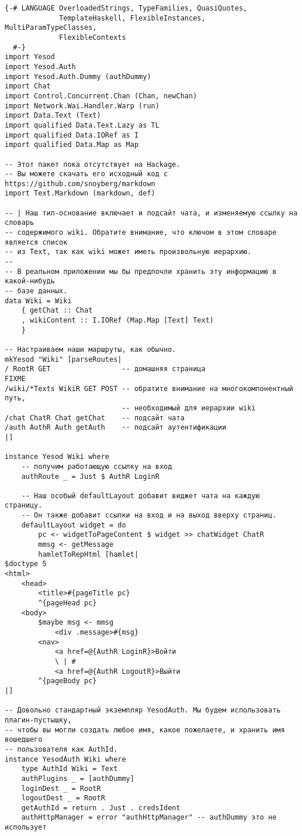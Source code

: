 \begin{lstlisting}
{-# LANGUAGE OverloadedStrings, TypeFamilies, QuasiQuotes,
             TemplateHaskell, FlexibleInstances, MultiParamTypeClasses,
             FlexibleContexts
  #-}
import Yesod
import Yesod.Auth
import Yesod.Auth.Dummy (authDummy)
import Chat
import Control.Concurrent.Chan (Chan, newChan)
import Network.Wai.Handler.Warp (run)
import Data.Text (Text)
import qualified Data.Text.Lazy as TL
import qualified Data.IORef as I
import qualified Data.Map as Map

-- Этот пакет пока отсутствует на Hackage.
-- Вы можете скачать его исходный код с https://github.com/snoyberg/markdown
import Text.Markdown (markdown, def)

-- | Наш тип-основание включает и подсайт чата, и изменяемую ссылку на словарь
-- содержимого wiki. Обратите внимание, что ключом в этом словаре является список
-- из Text, так как wiki может иметь произвольную иерархию.
--
-- В реальном приложении мы бы предпочли хранить эту информацию в какой-нибудь
-- базе данных.
data Wiki = Wiki
    { getChat :: Chat
    , wikiContent :: I.IORef (Map.Map [Text] Text)
    }

-- Настраиваем наши маршруты, как обычно.
mkYesod "Wiki" [parseRoutes|
/ RootR GET                 -- домашняя страница
FIXME
/wiki/*Texts WikiR GET POST -- обратите внимание на многокомпонентный путь,
                            -- необходимый для иерархии wiki
/chat ChatR Chat getChat    -- подсайт чата
/auth AuthR Auth getAuth    -- подсайт аутентификации
|]

instance Yesod Wiki where
    -- получим работающую ссылку на вход
    authRoute _ = Just $ AuthR LoginR

    -- Наш особый defaultLayout добавит виджет чата на каждую страницу.
    -- Он также добавит ссылки на вход и на выход вверху страниц.
    defaultLayout widget = do
        pc <- widgetToPageContent $ widget >> chatWidget ChatR
        mmsg <- getMessage
        hamletToRepHtml [hamlet|
$doctype 5
<html>
    <head>
        <title>#{pageTitle pc}
        ^{pageHead pc}
    <body>
        $maybe msg <- mmsg
            <div .message>#{msg}
        <nav>
            <a href=@{AuthR LoginR}>Войти
            \ | #
            <a href=@{AuthR LogoutR}>Выйти
        ^{pageBody pc}
|]

-- Довольно стандартный экземпляр YesodAuth. Мы будем использовать плагин-пустышку,
-- чтобы вы могли создать любое имя, какое пожелаете, и хранить имя вошедшего
-- пользователя как AuthId.
instance YesodAuth Wiki where
    type AuthId Wiki = Text
    authPlugins _ = [authDummy]
    loginDest _ = RootR
    logoutDest _ = RootR
    getAuthId = return . Just . credsIdent
    authHttpManager = error "authHttpManager" -- authDummy это не использует


\end{lstlisting}
